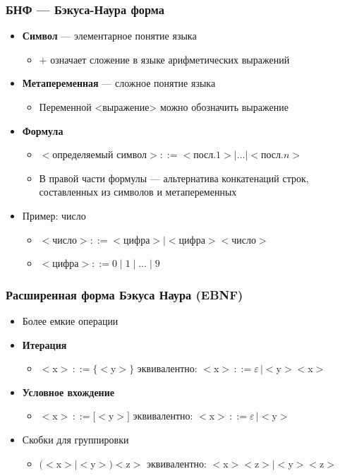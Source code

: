 \documentclass{beamer}
\begin{document}
\begin{frame}[fragile]
  \transwipe[direction=90]
  \frametitle{БНФ ---  Бэкуса-Наура форма}
  \begin{itemize}
    \item \textbf{Символ} --- элементарное понятие языка
    \begin{itemize}
      \item $+$ означает сложение в языке арифметических выражений
    \end{itemize}
    \item \textbf{Метапеременная} --- сложное понятие языка
    \begin{itemize}
      \item Переменной <выражение> можно обозначить выражение
    \end{itemize}
    \item \textbf{Формула}
    \begin{itemize}
      \item $<$определяемый символ$> ::= <$посл$.1> | \dots | <$посл$.n>$
      \item В правой части формулы --- альтернатива конкатенаций строк, составленных из символов и метапеременных
    \end{itemize}  
    \item Пример: число
    \begin{itemize}
      \item $<$число$> ::= <$цифра$> \mid <$цифра$><$число$>$ 
      \item $<$цифра$> ::= 0 \mid 1 \mid \dots \mid 9 $ 
    \end{itemize}
  \end{itemize}  
\end{frame}
    
 \begin{frame}[fragile]
   \transwipe[direction=90]
   \frametitle{Расширенная форма Бэкуса Наура (EBNF)}
   \begin{itemize}
     \item Более емкие операции
      \item \textbf{Итерация}  
      \begin{itemize}
        \item $<$x$> \, ::= \{ <$y$> \}$ эквивалентно: $<$x$> \, ::= \varepsilon \, | <$y$><$x$>$
      \end{itemize}   
      \item \textbf{Условное вхождение}  
      \begin{itemize}
        \item $<$x$> \, ::= [ <$y$> ]$ эквивалентно: $<$x$> \, ::= \varepsilon \, | <$y$>$
      \end{itemize}  
      \item Скобки для группировки
      \begin{itemize}
        \item $(<$x$> \mid <$y$>) <$z$>$ эквивалентно: $<$x$><$z$> \mid <$y$><$z$>$
      \end{itemize} 
  \end{itemize}
\end{frame}
\end{document}
